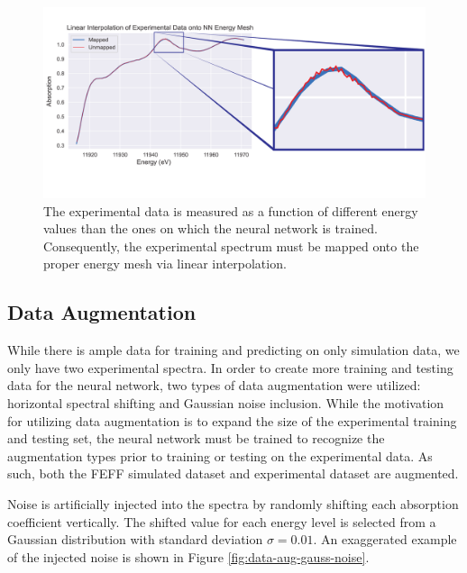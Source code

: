 \begin{figure}
    \centering
    \includegraphics[width=\linewidth]{Chapters/Figures/quality-of-interpolation-skinny.pdf}
    \caption[Experimental Data Interpolation]{The experimental data is measured as a function of different energy values than the ones on which the neural network is trained. Consequently, the experimental spectrum must be mapped onto the proper energy mesh via linear interpolation.}
    \label{fig:interpolation-skinny}
\end{figure}

\subsection{Data Augmentation}
While there is ample data for training and predicting on only simulation data, we only have two experimental spectra. In order to create more training and testing data for the neural network, two types of data augmentation were utilized: horizontal spectral shifting and Gaussian noise inclusion. While the motivation for utilizing data augmentation is to expand the size of the experimental training and testing set, the neural network must be trained to recognize the augmentation types prior to training or testing on the experimental data. As such, both the FEFF simulated dataset and experimental dataset are augmented.

Noise is artificially injected into the spectra by randomly shifting each absorption coefficient vertically. The shifted value for each energy level is selected from a Gaussian distribution with standard deviation $ \sigma=0.01 $. An exaggerated example of the injected noise is shown in Figure \ref{fig:data-aug-gauss-noise}.

